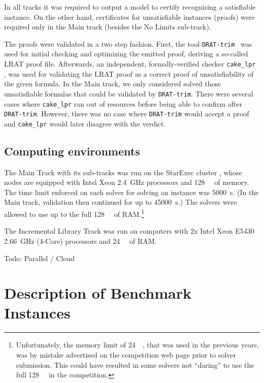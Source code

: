 \documentclass{elsarticle}
\newcommand{\todo}[1]{{\color{purple}Todo: #1}}
\begin{document}
\label{sec:certif}

In all tracks it was required to output a model to certify recognising a satisfiable instance.
On the other hand, certificates for unsatisfiable instances (proofs) were required only 
in the Main track (besides the No Limits sub-track).

The proofs were validated in a two step fashion. First, the tool {\tt DRAT-trim}~\cite{DRATtrim}
was used for initial checking and optimizing the emitted proof, deriving a so-called LRAT proof file.
Afterwards, an independent, formally-verified checker {\tt cake\_lpr} \cite{cakeLprGithub}, 
was used for validating the LRAT proof as a correct proof of unsatisfiability of the given formula.
In the Main track, we only considered solved those unsatisfiable formulas that 
could be validated by {\tt DRAT-trim}.
There were several cases where {\tt cake\_lpr} ran out of resources before being able to 
confirm after {\tt DRAT-trim}. However, there was no case where {\tt DRAT-trim} would accept
a proof and {\tt cake\_lpr} would later disagree with the verdict.

\subsection{Computing environments}

\label{sec:computing}
The Main Track with its sub-tracks was run on the StarExec cluster \cite{starexec},
whose nodes are equipped with Intel Xeon \SI{2.4}{\giga\hertz} processors 
and \SI{128}{\giga\byte} of memory.
The time limit enforced on each solver for solving an instance was \SI{5000}{\second}. 
(In the Main track, validation then continued for up to \SI{45000}{\second}.)
The solvers were allowed to use up to the full \SI{128}{\giga\byte} of RAM.\footnote{
Unfortunately, the memory limit of \SI{24}{\giga\byte}, that was used in the previous years,
was by mistake advertised on the competition web page prior to solver submission.
This could have resulted in some solvers not ``daring'' to use the full \SI{128}{\giga\byte}
in the competition.}

The Incremental Library Track was run on computers with 2x Intel Xeon E5430 \SI{2.66}{\giga\hertz}
(4-Core) processors and \SI{24}{\giga\byte} of RAM.

\todo{Parallel / Cloud}

\section{Description of Benchmark Instances}
\label{sec:instances}
\end{document}
